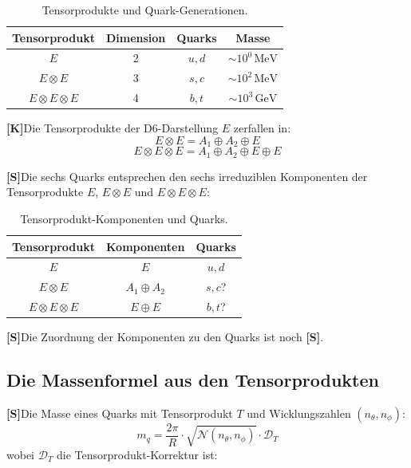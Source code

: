 \documentclass[11pt,a4paper]{article}
\newcommand{\Kstatus}{\textbf{[K]}}
\newcommand{\Sstatus}{\textbf{[S]}}
\begin{document}
	\begin{table}[h!]
		\centering
		\caption{Tensorprodukte und Quark-Generationen.}
		\label{tab:tensor_products}
		\begin{tabular}{c c c c}
			\toprule
			\textbf{Tensorprodukt} & \textbf{Dimension} & \textbf{Quarks} & \textbf{Masse} \\
			\midrule
			$E$ & 2 & $u, d$ & $\sim 10^0\,\text{MeV}$ \\
			$E \otimes E$ & 3 & $s, c$ & $\sim 10^2\,\text{MeV}$ \\
			$E \otimes E \otimes E$ & 4 & $b, t$ & $\sim 10^3\,\text{GeV}$ \\
			\bottomrule
		\end{tabular}
	\end{table}
	
	\Kstatus Die Tensorprodukte der D6-Darstellung $E$ zerfallen in:
	\begin{equation}
		E \otimes E = A_1 \oplus A_2 \oplus E
	\end{equation}
	\begin{equation}
		E \otimes E \otimes E = A_1 \oplus A_2 \oplus E \oplus E
	\end{equation}
	
	\Sstatus Die sechs Quarks entsprechen den sechs irreduziblen Komponenten der Tensorprodukte $E$, $E \otimes E$ und $E \otimes E \otimes E$:
	
	\begin{table}[h!]
		\centering
		\caption{Tensorprodukt-Komponenten und Quarks.}
		\label{tab:tensor_components}
		\begin{tabular}{c c c}
			\toprule
			\textbf{Tensorprodukt} & \textbf{Komponenten} & \textbf{Quarks} \\
			\midrule
			$E$ & $E$ & $u, d$ \\
			$E \otimes E$ & $A_1 \oplus A_2$ & $s, c$? \\
			$E \otimes E \otimes E$ & $E \oplus E$ & $b, t$? \\
			\bottomrule
		\end{tabular}
	\end{table}
	
	\Sstatus Die Zuordnung der Komponenten zu den Quarks ist noch \Sstatus.
	
	\subsection{Die Massenformel aus den Tensorprodukten}
	
	\Sstatus Die Masse eines Quarks mit Tensorprodukt $T$ und Wicklungszahlen $(n_\theta, n_\phi)$:
	\begin{equation}
		m_q = \frac{2\pi}{R} \cdot \sqrt{\mathcal{N}(n_\theta, n_\phi)} \cdot \mathcal{D}_T
	\end{equation}
	wobei $\mathcal{D}_T$ die Tensorprodukt-Korrektur ist:
	
\end{document}
